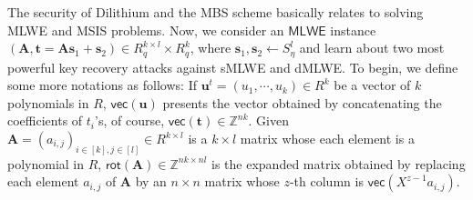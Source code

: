 \documentclass[conference]{IEEEtran}
\begin{document}
		The security of \textsf{Dilithium} and the \textsf{MBS} scheme basically relates to solving \textsf{MLWE} and \textsf{MSIS} problems. Now, we consider an $\mathsf{MLWE}$ instance $(\mathbf{A},\mathbf{t}=\mathbf{A}\mathbf{s}_1+\mathbf{s}_2) \in R_q^{k\times l}\times R_q^k$, where $\mathbf{s}_1, \mathbf{s}_2\leftarrow S_{\eta}^l$ and learn about two most powerful key recovery attacks against \textsf{sMLWE} and \textsf{dMLWE}. To begin, we define some more notations as follows: If $\mathbf{u}^t=(u_1, \cdots,u_k) \in R^k$ be a vector of $k$ polynomials in $R$, $\textsf{vec}(\mathbf{u})$ presents the vector obtained by concatenating the coefficients of $t_i$'s, of course, $\textsf{vec}(\mathbf{t}) \in \mathbb{Z}^{nk}$. Given $\mathbf{A}=(a_{i,j})_{i\in[k], j\in [l] }\in R^{k\times l}$ is a $k\times l$ matrix  whose each element is a polynomial in $R$, $\textsf{rot}(\mathbf{A}) \in \mathbb{Z}^{nk\times nl}$ is the expanded matrix obtained by replacing each element $a_{i,j}$ of $\mathbf{A}$ by an $n\times n$ matrix whose $z$-th column is $\textsf{vec}(X^{z-1}a_{i,j})$. 
\end{document}
